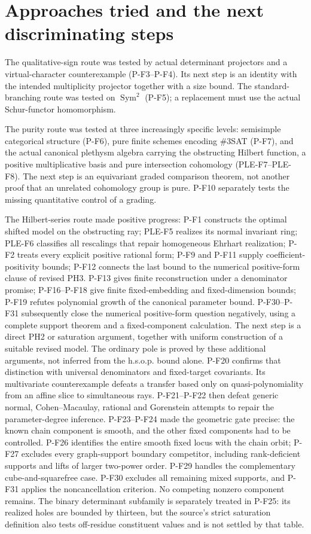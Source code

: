 \section{Approaches tried and the next discriminating steps}
The qualitative-sign route was tested by actual determinant projectors
and a virtual-character counterexample (P-F3--P-F4). Its next step is an
identity with the intended multiplicity projector together with a size
bound. The standard-branching route was tested on $\operatorname{Sym}^2$
(P-F5); a replacement must use the actual Schur-functor homomorphism.

The purity route was tested at three increasingly specific levels:
semisimple categorical structure (P-F6), pure finite schemes encoding
\#3SAT (P-F7), and the actual canonical plethysm algebra carrying the
obstructing Hilbert function, a positive multiplicative basis and pure
intersection cohomology (PLE-F7--PLE-F8). The next step is an
equivariant graded comparison theorem, not another proof that an unrelated
cohomology group is pure. P-F10 separately tests the missing quantitative
control of a grading.

The Hilbert-series route made positive progress: P-F1 constructs the
optimal shifted model on the obstructing ray; PLE-F5 realizes its normal
invariant ring; PLE-F6 classifies all rescalings that repair homogeneous
Ehrhart realization; P-F2 treats every explicit positive rational form;
P-F9 and P-F11 supply coefficient-positivity bounds; P-F12 connects the
last bound to the numerical positive-form clause of revised PH3.
P-F13 gives finite reconstruction under a denominator promise;
P-F16--P-F18 give finite fixed-embedding and fixed-dimension bounds;
P-F19 refutes polynomial growth of the canonical parameter bound.
P-F30--P-F31 subsequently close the numerical positive-form question
negatively, using a complete support theorem and a fixed-component
calculation. The next step is a direct PH2 or saturation argument,
together with uniform construction of a suitable revised model.
The ordinary pole is proved by these additional arguments, not
inferred from the h.s.o.p. bound alone.
P-F20 confirms that distinction with universal denominators and
fixed-target covariants. Its multivariate counterexample defeats a
transfer based only on quasi-polynomiality from an affine slice to
simultaneous rays. P-F21--P-F22 then defeat generic normal,
Cohen--Macaulay, rational and Gorenstein attempts to repair the
parameter-degree inference. P-F23--P-F24 made the geometric gate precise: the known chain
component is smooth, and the other fixed components had to be
controlled. P-F26 identifies the entire smooth fixed locus with
the chain orbit; P-F27 excludes every graph-support boundary
competitor, including rank-deficient supports and lifts of larger
two-power order. P-F29 handles the complementary cube-and-squarefree
case. P-F30 excludes all remaining mixed supports, and P-F31 applies
the noncancellation criterion. No competing nonzero component remains. The binary determinant subfamily is separately treated
in P-F25: its realized holes are bounded by thirteen, but the
source's strict saturation definition also tests off-residue
constituent values and is not settled by that table.

